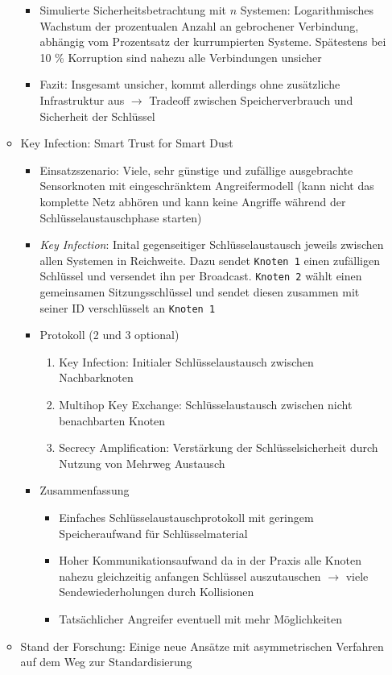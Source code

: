 \begin{itemize}
\begin{itemize}
\begin{itemize}
			\item Simulierte Sicherheitsbetrachtung mit \(n\) Systemen: Logarithmisches Wachstum der prozentualen Anzahl an gebrochener Verbindung, abhängig vom Prozentsatz der kurrumpierten Systeme. Spätestens bei 10 \% Korruption sind nahezu alle Verbindungen unsicher
			\item Fazit: Insgesamt unsicher, kommt allerdings ohne zusätzliche Infrastruktur aus \(\rightarrow\) Tradeoff zwischen Speicherverbrauch und Sicherheit der Schlüssel
		\end{itemize}
		\item Key Infection: Smart Trust for Smart Dust
		\begin{itemize}
			\item Einsatzszenario: Viele, sehr günstige und zufällige ausgebrachte Sensorknoten mit eingeschränktem Angreifermodell (kann nicht das komplette Netz abhören und kann keine Angriffe während der Schlüsselaustauschphase starten)
			\item \textit{Key Infection}: Inital gegenseitiger Schlüsselaustausch jeweils zwischen allen Systemen in Reichweite. Dazu sendet \texttt{Knoten 1} einen zufälligen Schlüssel und versendet ihn per Broadcast. \texttt{Knoten 2} wählt einen gemeinsamen Sitzungsschlüssel und sendet diesen zusammen mit seiner ID verschlüsselt an \texttt{Knoten 1}
			\item Protokoll (2 und 3 optional)
			\begin{enumerate}
				\item Key Infection: Initialer Schlüsselaustausch zwischen Nachbarknoten
				\item Multihop Key Exchange: Schlüsselaustausch zwischen nicht benachbarten Knoten
				\item Secrecy Amplification: Verstärkung der Schlüsselsicherheit durch Nutzung von Mehrweg Austausch
			\end{enumerate}
			\item Zusammenfassung
			\begin{itemize}
				\item Einfaches Schlüsselaustauschprotokoll mit geringem Speicheraufwand für Schlüsselmaterial
				\item Hoher Kommunikationsaufwand da in der Praxis alle Knoten nahezu gleichzeitig anfangen Schlüssel auszutauschen \(\rightarrow\) viele Sendewiederholungen durch Kollisionen
				\item Tatsächlicher Angreifer eventuell mit mehr Möglichkeiten
			\end{itemize}
		\end{itemize}
		\item Stand der Forschung: Einige neue Ansätze mit asymmetrischen Verfahren auf dem Weg zur Standardisierung
	\end{itemize}
\end{itemize}



